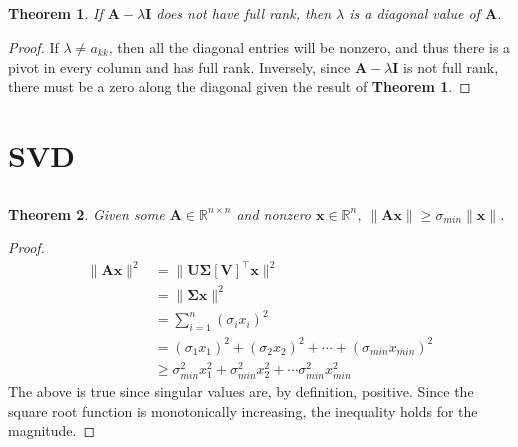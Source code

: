 \documentclass[]{article}
\newtheorem{genthm}{Theorem}
\newcommand{\tpose}[1]{\left[#1\right]^{\! \top} \!\!}
\begin{document}
\subsection{}

\begin{genthm}
If \(\bm{A} - \lambda \bm{I}\) does not have full rank, then \(\lambda\) is a diagonal value of \(\bm{A}\).
\end{genthm}

\begin{proof}
If \(\lambda \neq a_{kk}\), then all the diagonal entries will be nonzero, and thus there is a pivot in every column and has full rank.
Inversely, since \(\bm{A} - \lambda \bm{I}\) is not full rank, there must be a zero along the diagonal given the result of \textbf{Theorem 1}.
\end{proof}

\section{SVD}

\subsection{}

\begin{genthm}
Given some \(\bm{A} \in \mathbb{R}^{n \times n}\) and nonzero \(\bm{x} \in \mathbb{R}^n\), \(\|\bm{Ax}\| \geqslant \sigma_{min} \|\bm{x}\|\).
\end{genthm}

\begin{proof}
\begin{align}
	\|\bm{Ax}\|^2 &= \|\bm{U\Sigma}\tpose{\bm{V}}\bm{x}\|^2 \\
	&= \|\bm{\Sigma x}\|^2 \\
	&= \sum_{i = 1}^n (\sigma_i x_i)^2 \\
	&= (\sigma_1 x_1)^2 + (\sigma_2 x_2)^2 + \cdots + (\sigma_{min} x_{min})^2 \\
	&\geqslant \sigma_{min}^2 x_1^2 + \sigma_{min}^2 x_2^2 + \cdots \sigma_{min}^2 x_{min}^2
\end{align}
The above is true since singular values are, by definition, positive.
Since the square root function is monotonically increasing, the inequality holds for the magnitude.
\end{proof}

\subsection{}
\end{document}
